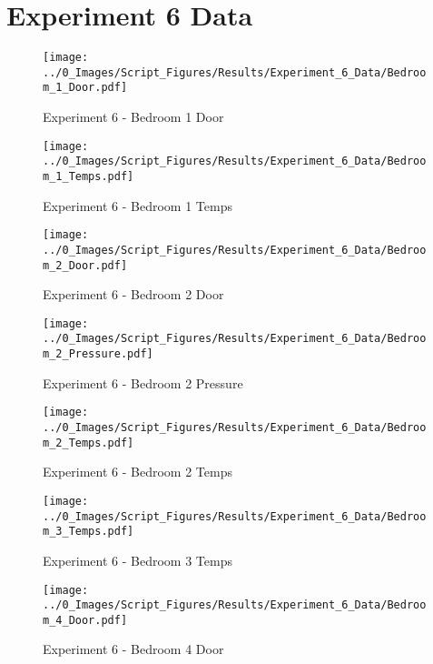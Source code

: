 	\clearpage

\clearpage		\large
\section{Experiment 6 Data} \label{App:Exp6Results} 

	\begin{figure}[H]
		\centering
		\texttt{[image: ../0\_Images/Script\_Figures/Results/Experiment\_6\_Data/Bedroom\_1\_Door.pdf]}
		\caption[]{Experiment 6 - Bedroom 1 Door}
	\end{figure}
 

	\begin{figure}[H]
		\centering
		\texttt{[image: ../0\_Images/Script\_Figures/Results/Experiment\_6\_Data/Bedroom\_1\_Temps.pdf]}
		\caption[]{Experiment 6 - Bedroom 1 Temps}
	\end{figure}
 
	\clearpage

	\begin{figure}[H]
		\centering
		\texttt{[image: ../0\_Images/Script\_Figures/Results/Experiment\_6\_Data/Bedroom\_2\_Door.pdf]}
		\caption[]{Experiment 6 - Bedroom 2 Door}
	\end{figure}
 

	\begin{figure}[H]
		\centering
		\texttt{[image: ../0\_Images/Script\_Figures/Results/Experiment\_6\_Data/Bedroom\_2\_Pressure.pdf]}
		\caption[]{Experiment 6 - Bedroom 2 Pressure}
	\end{figure}
 
	\clearpage

	\begin{figure}[H]
		\centering
		\texttt{[image: ../0\_Images/Script\_Figures/Results/Experiment\_6\_Data/Bedroom\_2\_Temps.pdf]}
		\caption[]{Experiment 6 - Bedroom 2 Temps}
	\end{figure}
 

	\begin{figure}[H]
		\centering
		\texttt{[image: ../0\_Images/Script\_Figures/Results/Experiment\_6\_Data/Bedroom\_3\_Temps.pdf]}
		\caption[]{Experiment 6 - Bedroom 3 Temps}
	\end{figure}
 
	\clearpage

	\begin{figure}[H]
		\centering
		\texttt{[image: ../0\_Images/Script\_Figures/Results/Experiment\_6\_Data/Bedroom\_4\_Door.pdf]}
		\caption[]{Experiment 6 - Bedroom 4 Door}
	\end{figure}
 

